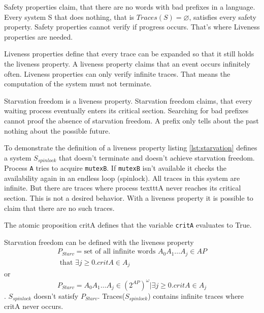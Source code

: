 \documentclass[12pt,a4paper,twoside]{article}
\begin{document}
Safety properties claim, that there are no words with bad prefixes in a language. Every system S that does nothing, that is $Traces(S)=\varnothing$, satisfies every safety property. Safety properties cannot verify if progress occurs. That's where Liveness properties are needed.

Liveness properties define that every trace can be expanded so that it still holds the liveness property. A liveness property claims that an event occurs infinitely often. Liveness properties can only verify infinite traces. That means the computation of the system must not terminate.

Starvation freedom is a liveness property. Starvation freedom claims, that every waiting process eventually enters its critical section. Searching for bad prefixes cannot proof the absence of starvation freedom. A prefix only tells about the past nothing about the possible future.



To demonstrate the definition of a liveness property listing \ref{lst:starvation} defines a system $S_{spinlock}$ that doesn't terminate and doesn't achieve starvation freedom. Process \texttt{A} tries to acquire \texttt{mutexB}. If \texttt{mutexB} isn't available it checks the availability again in an endless loop (spinlock). All traces in this system are infinite. But there are traces where process texttt{A} never reaches its critical section. This is not a desired behavior. With a liveness property it is possible to claim that there are no such traces.

The atomic proposition critA defines that the variable \texttt{critA} evaluates to True.

Starvation freedom can be defined with the liveness property
\begin{multline}
  \label{eq:starvationfreedom_in_words}
  P_{Starv} = \text{set of all infinite words } A_0 A_1 \dots A_j \in AP \\ \text{ that }\exists j \geq 0. critA \in A_j
\end{multline}
or
\begin{equation}
  \label{eq:starvationfreedom}
P_{Starv} = { A_0 A_1 \dots A_j \in (2^{AP})^{\omega} | \exists j \geq 0. critA \in A_j}
\end{equation}.
$S_{spinlock}$ doesn't satisfy $P_{Starv}$. Traces($S_{spinlock}$) contains infinite traces where critA never occurs.
\end{document}
